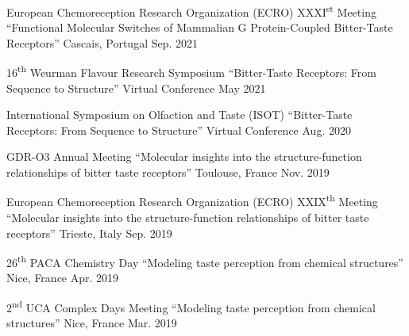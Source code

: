 
\begin{cvhonors}

    \cvhonor
    {European Chemoreception Research Organization (ECRO) \textsc{XXXI}\textsuperscript{st} Meeting}
    {``Functional Molecular Switches of Mammalian G Protein-Coupled Bitter-Taste Receptors''}
    {Cascais, Portugal}
    {Sep. 2021}

    \cvhonor
    {16\textsuperscript{th} Weurman Flavour Research Symposium}
    {``Bitter-Taste Receptors: From Sequence to Structure''}
    {Virtual Conference}
    {May 2021}

    \cvhonor
    {International Symposium on Olfaction and Taste (ISOT)}
    {``Bitter-Taste Receptors: From Sequence to Structure''}
    {Virtual Conference}
    {Aug. 2020}

    \cvhonor
    {GDR-O3 Annual Meeting}
    {``Molecular insights into the structure-function relationships of bitter taste receptors''}
    {Toulouse, France}
    {Nov. 2019}

    \cvhonor
    {European Chemoreception Research Organization (ECRO) \textsc{XXIX}\textsuperscript{th} Meeting}
    {``Molecular insights into the structure-function relationships of bitter taste receptors''}
    {Trieste, Italy}
    {Sep. 2019}

    \cvhonor
    {26\textsuperscript{th} PACA Chemistry Day}
    {``Modeling taste perception from chemical structures''}
    {Nice, France}
    {Apr. 2019}

    \cvhonor
    {2\textsuperscript{nd} UCA Complex Days Meeting}
    {``Modeling taste perception from chemical structures''}
    {Nice, France}
    {Mar. 2019}

\end{cvhonors}
